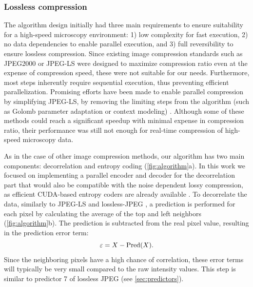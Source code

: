 
    
    \subsubsection{Lossless compression}
    The algorithm design initially had three main requirements to ensure suitability for a high-speed microscopy environment: 1) low complexity for fast execution, 2) no data dependencies to enable parallel execution, and 3) full reversibility to ensure lossless compression. Since existing image compression standards such as JPEG2000 \cite{adams_jpeg-2000_2001} or JPEG-LS \cite{weinberger_loco-i_2000} were designed to maximize compression ratio even at the expense of compression speed, these were not suitable for our needs. Furthermore, most steps inherently require sequential execution, thus preventing efficient parallelization. Promising efforts have been made to enable parallel compression by simplifying JPEG-LS, by removing the limiting steps from the algorithm (such as Golomb parameter adaptation or context modeling) \cite{wang_fast_2012,starosolski_simple_2007}. Although some of these methods could reach a significant speedup with minimal expense in compression ratio, their performance was still not enough for real-time compression of high-speed microscopy data.

    As in the case of other image compression methods, our algorithm has two main components: decorrelation and entropy coding (\autoref{fig:algorithm}a). In this work we focused on implementing a parallel encoder and decoder for the decorrelation part that would also be compatible with the noise dependent lossy compression, as efficient CUDA-based entropy coders are already available \cite{treib_interactive_2012}. To decorrelate the data, similarly to JPEG-LS and lossless-JPEG \cite{pennebaker_jpeg:_1992}, a prediction is performed for each pixel by calculating the average of the top and left neighbors (\autoref{fig:algorithm}b). The prediction is subtracted from the real pixel value, resulting in the prediction error term:
    \begin{equation}
      \varepsilon = X - \operatorname{Pred}(X).
    \end{equation}
    Since the neighboring pixels have a high chance of correlation, these error terms will typically be very small compared to the raw intensity values. This step is similar to predictor 7 of lossless JPEG (see \ref{sec:predictors}).


